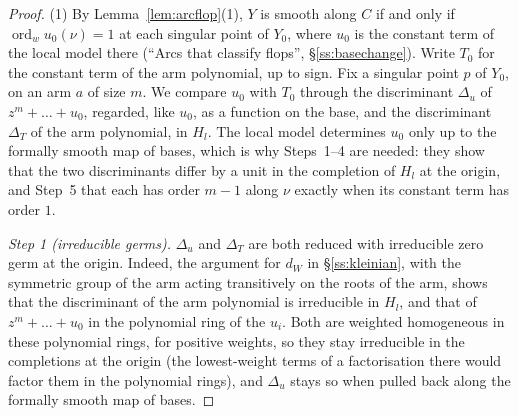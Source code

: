 \documentclass[11pt]{amsart}
\numberwithin{table}{section}
\numberwithin{figure}{section}
\numberwithin{equation}{section}
\theoremstyle{definition}
\theoremstyle{plain}
\DeclareMathOperator{\ord}{ord}
\begin{document}
\begin{proof}
(1) By Lemma~\ref{lem:arcflop}(1), $Y$ is smooth along $C$ if and only if $\ord_w u_0(\nu) = 1$ at each singular point of $Y_0$, where $u_0$ is the constant term of the local model there (``Arcs that classify flops'', \S\ref{ss:basechange}). Write $T_0$ for the constant term of the arm polynomial, up to sign. Fix a singular point $p$ of $Y_0$, on an arm $a$ of size $m$. We compare $u_0$ with $T_0$ through the discriminant $\Delta_u$ of $z^m + \dots + u_0$, regarded, like $u_0$, as a function on the base, and the discriminant $\Delta_T$ of the arm polynomial, in $H_l$. The local model determines $u_0$ only up to the formally smooth map of bases, which is why Steps~1--4 are needed: they show that the two discriminants differ by a unit in the completion of $H_l$ at the origin, and Step~5 that each has order $m - 1$ along $\nu$ exactly when its constant term has order $1$.

\emph{Step 1 (irreducible germs).} $\Delta_u$ and $\Delta_T$ are both reduced with irreducible zero germ at the origin. Indeed, the argument for $d_W$ in \S\ref{ss:kleinian}, with the symmetric group of the arm acting transitively on the roots of the arm, shows that the discriminant of the arm polynomial is irreducible in $H_l$, and that of $z^m + \dots + u_0$ in the polynomial ring of the $u_i$. Both are weighted homogeneous in these polynomial rings, for positive weights, so they stay irreducible in the completions at the origin (the lowest-weight terms of a factorisation there would factor them in the polynomial rings), and $\Delta_u$ stays so when pulled back along the formally smooth map of bases.


\end{proof}
\end{document}
